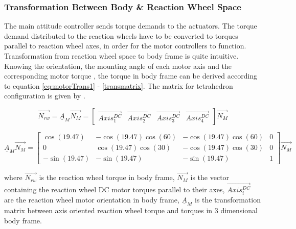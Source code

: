 
\subsubsection{Transformation Between Body \& Reaction Wheel Space}

The main attitude controller sends torque demands to the actuators. The torque demand distributed to the reaction wheels have to be converted to torques parallel to reaction wheel axes, in order for the motor controllers to function. Transformation from reaction wheel space to body frame is quite intuitive. Knowing the orientation, the mounting angle of each motor axis and the corresponding motor torque
, the torque in body frame can be derived according to equation \ref{eq:motorTrans1} - \ref{transmatrix}. The matrix for tetrahedron configuration is given by \cite{reactionWheelConfigThesis}.

\begin{equation}
\label{eq:motorTrans1}
\vec{N_{rw}} = \underline{A}_{M} \vec{N_{M}} = \begin{bmatrix}
\vec{Axis^{DC}_{1}}       & \vec{Axis^{DC}_{2}}   & \vec{Axis^{DC}_{3}}   & \vec{Axis^{DC}_{4}} 
\end{bmatrix} \vec{N_{M}}
\end{equation}

\begin{equation}
\underline{A}_{M} \vec{N_{M}}  = 
\begin{bmatrix}
\cos(19.47)       & -\cos(19.47) \cos(60)  &  -\cos(19.47) \cos(60)  & 0 \\
0       & \cos(19.47) \cos(30)  &  -\cos(19.47) \cos(30)  & 0 \\
-\sin(19.47)       & -\sin(19.47)   &  -\sin(19.47)   & 1
\end{bmatrix} \vec{N_{M}}
\label{eq:transmatrix}
\end{equation}

where $\vec{N_{rw}}$ is the reaction wheel torque in body frame, $\vec{N_{M}}$ is the vector containing the reaction wheel DC motor torques parallel to their axes, $\vec{Axis^{DC}_{i}}$ are the reaction wheel motor orientation in body frame, $\underline{A}_{M}$ is the transformation matrix between axis oriented reaction wheel torque and torques in 3 dimensional body frame.



